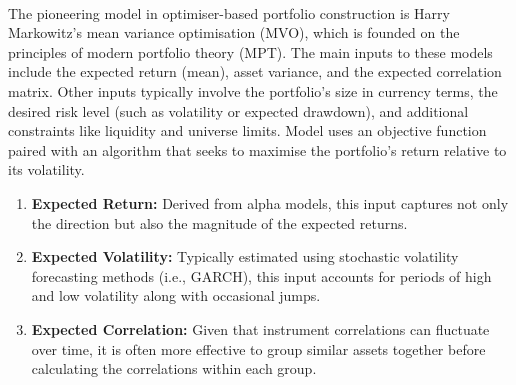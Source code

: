 \begin{remark} \\
The pioneering model in optimiser-based portfolio construction is Harry Markowitz's mean variance optimisation (MVO), which is founded on the principles of modern portfolio theory (MPT). The main inputs to these models include the expected return (mean), asset variance, and the expected correlation matrix. Other inputs typically involve the portfolio’s size in currency terms, the desired risk level (such as volatility or expected drawdown), and additional constraints like liquidity and universe limits. Model uses an objective function paired with an algorithm that seeks to maximise the portfolio’s return relative to its volatility.
\begin{enumerate}[label=\roman*.]
\setlength{\itemsep}{0pt}
\item \textbf{Expected Return:} Derived from alpha models, this input captures not only the direction but also the magnitude of the expected returns.
\item \textbf{Expected Volatility:} Typically estimated using stochastic volatility forecasting methods (i.e., GARCH), this input accounts for periods of high and low volatility along with occasional jumps.
\item \textbf{Expected Correlation:} Given that instrument correlations can fluctuate over time, it is often more effective to group similar assets together before calculating the correlations within each group.
\end{enumerate}
\end{remark}

